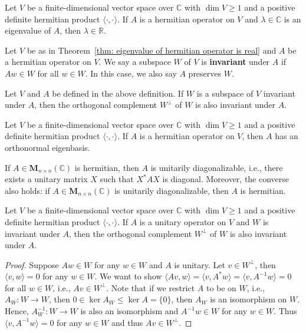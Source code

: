 \documentclass{ctexart}
\newcommand{\M}{\mathbf{M}}
\newcommand{\R}{\mathbb{R}}
\newcommand{\C}{\mathbb{C}}
\begin{document}
    \begin{mythm}\label{thm: eigenvalue of hermitian operator is real}
        Let $V$ be a finite-dimensional vector space over $\C$ with $\dim V\ge 1$ and a positive definite hermitian product $\langle \cdot, \cdot \rangle$. If $A$ is a hermitian operator on $V$ and $\lambda \in \C$ is an eigenvalue of $A$, then $\lambda \in \R$.
    \end{mythm}
    \begin{mydef}
        Let $V$ be as in Theorem~\ref{thm: eigenvalue of hermitian operator is real} and $A$ be a hermitian operator on $V$. We say a subspace $W$ of $V$ is \textbf{invariant} under $A$ if $A w \in W$ for all $w\in W$. In this case, we also say $A$ preserves $W$.
    \end{mydef}
    \begin{mylma}
        Let $V$ and $A$ be defined in the above definition. If $W$ is a subspace of $V$ invariant under $A$, then the orthogonal complement $W^\perp$ of $W$ is also invariant under $A$.
    \end{mylma}
    \begin{mythm}
        Let $V$ be a finite-dimensional vector space over $\C$ with $\dim V\ge 1$ and a positive definite hermitian product $\langle \cdot, \cdot \rangle$. If $A$ is a hermitian operator on $V$, then $A$ has an orthonormal eigenbasis.
    \end{mythm}
    \begin{myrmk}
        If $A\in \M_{n\times n}(\C)$ is hermitian, then $A$ is unitarily diagonalizable, i.e., there exists a unitary matrix $X$ such that $X^* A X$ is diagonal. Moreover, the converse also holds: if $A\in \M_{n\times n}(\C)$ is unitarily diagonalizable, then $A$ is hermitian.
    \end{myrmk}
    \begin{mylma}
        Let $V$ be a finite-dimensional vector space over $\C$ with $\dim V\ge 1$ and a positive definite hermitian product $\langle \cdot, \cdot \rangle$. If $A$ is a unitary operator on $V$ and $W$ is invariant under $A$, then the orthogonal complement $W^\perp$ of $W$ is also invariant under $A$.
    \end{mylma}
    \begin{proof}
        Suppose $Aw \in W$ for any $w\in W$ and $A$ is unitary. Let $v\in W^\perp$, then $\langle v,w \rangle = 0$ for any $w\in W$. We want to show $\langle Av,w \rangle = \langle v, A^* w \rangle = \langle v, A^{-1} w \rangle = 0$ for all $w\in W$, i.e., $Av \in W^\perp$. Note that if we restrict $A$ to be on $W$, i.e., $A_W:W\to W$, then $0\in \ker A_W \le \ker A = \{ 0\}$, then $A_W$ is an isomorphism on $W$. Hence, $A_W^{-1}: W\to W$ is also an isomorphism and $A^{-1} w \in W$ for any $w\in W$. Thus $\langle v, A^{-1} w \rangle = 0$ for any $w\in W$ and thus $Av \in W^\perp$.
    \end{proof}
\end{document}

